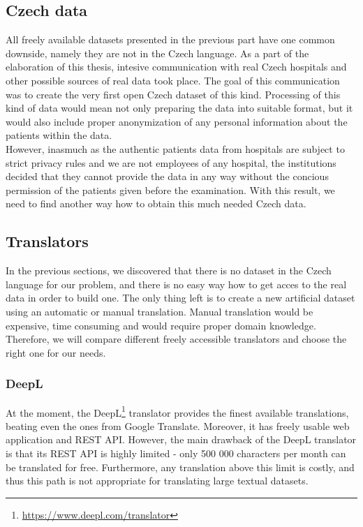 \subsection{Czech data}
\label{sec:CzechData}
All freely available datasets presented in the previous part have one common downside, namely they are not in the Czech language. As a part of the elaboration of this thesis, intesive communication with real Czech hospitals and other possible sources of real data took place. The goal of this communication was to create the very first open Czech dataset of this kind. Processing of this kind of data would mean not only preparing the data into suitable format, but it would also include proper anonymization of any personal information about the patients within the data. \\

However, inasmuch as the authentic patients data from hospitals are subject to strict privacy rules and we are not employees of any hospital, the institutions decided that they cannot provide the data in any way without the concious permission of the patients given before the examination. With this result, we need to find another way how to obtain this much needed Czech data.

\subsection{Translators}
\label{sec:Translators}
In the previous sections, we discovered that there is no dataset in the Czech language for our problem, and there is no easy way how to get acces to the real data in order to build one. The only thing left is to create a new artificial dataset using an automatic or manual translation. Manual translation would be expensive, time consuming and would require proper domain knowledge. Therefore, we will compare different freely accessible translators and choose the right one for our needs.

\subsubsection{DeepL}
At the moment, the DeepL\footnote[11]{\url{https://www.deepl.com/translator}} translator provides the finest available translations, beating even the ones from Google Translate. Moreover, it has freely usable web application and REST API. However, the main drawback of the DeepL translator is that its REST API is highly limited - only 500 000 characters per month can be translated for free. Furthermore, any translation above this limit is costly, and thus this path is not appropriate for translating large textual datasets.

